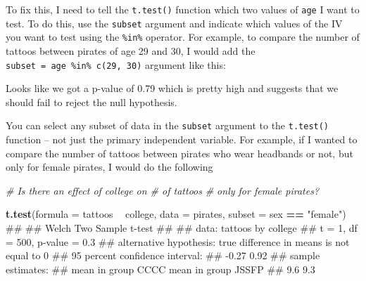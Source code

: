 \documentclass[]{book}
\newenvironment{Shaded}{\begin{snugshade}}{\end{snugshade}}
\newcommand{\KeywordTok}[1]{\textcolor[rgb]{0.13,0.29,0.53}{\textbf{#1}}}
\newcommand{\DataTypeTok}[1]{\textcolor[rgb]{0.13,0.29,0.53}{#1}}
\newcommand{\DecValTok}[1]{\textcolor[rgb]{0.00,0.00,0.81}{#1}}
\newcommand{\StringTok}[1]{\textcolor[rgb]{0.31,0.60,0.02}{#1}}
\newcommand{\CommentTok}[1]{\textcolor[rgb]{0.56,0.35,0.01}{\textit{#1}}}
\newcommand{\OperatorTok}[1]{\textcolor[rgb]{0.81,0.36,0.00}{\textbf{#1}}}
\newcommand{\NormalTok}[1]{#1}
\theoremstyle{definition}
\theoremstyle{definition}
\theoremstyle{remark}
\begin{document}
To fix this, I need to tell the \texttt{t.test()} function which two
values of \texttt{age} I want to test. To do this, use the
\texttt{subset} argument and indicate which values of the IV you want to
test using the \texttt{\%in\%} operator. For example, to compare the
number of tattoos between pirates of age 29 and 30, I would add the
\texttt{subset\ =\ age\ \%in\%\ c(29,\ 30)} argument like this:

\begin{Shaded}
\end{Shaded}

Looks like we got a p-value of 0.79 which is pretty high and suggests
that we should fail to reject the null hypothesis.

You can select any subset of data in the \texttt{subset} argument to the
\texttt{t.test()} function -- not just the primary independent variable.
For example, if I wanted to compare the number of tattoos between
pirates who wear headbands or not, but only for female pirates, I would
do the following

\begin{Shaded}
\begin{Highlighting}[]
\CommentTok{# Is there an effect of college on # of tattoos}
\CommentTok{#  only for female pirates?}

\KeywordTok{t.test}\NormalTok{(}\DataTypeTok{formula =}\NormalTok{ tattoos }\OperatorTok{~}\StringTok{ }\NormalTok{college,}
       \DataTypeTok{data =}\NormalTok{ pirates,}
       \DataTypeTok{subset =}\NormalTok{ sex }\OperatorTok{==}\StringTok{ "female"}\NormalTok{)}
\NormalTok{## }
\NormalTok{##  Welch Two Sample t-test}
\NormalTok{## }
\NormalTok{## data:  tattoos by college}
\NormalTok{## t = 1, df = 500, p-value = 0.3}
\NormalTok{## alternative hypothesis: true difference in means is not equal to 0}
\NormalTok{## 95 percent confidence interval:}
\NormalTok{##  -0.27  0.92}
\NormalTok{## sample estimates:}
\NormalTok{##  mean in group CCCC mean in group JSSFP }
\NormalTok{##                 9.6                 9.3}
\end{Highlighting}
\end{Shaded}
\end{document}
